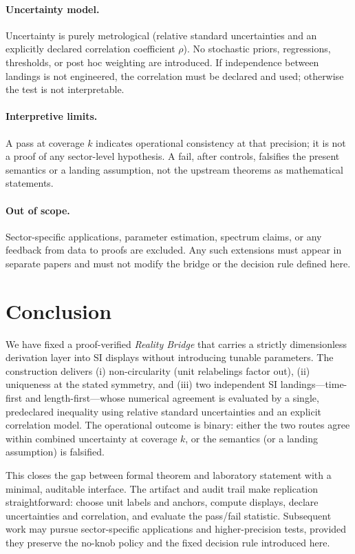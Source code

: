 \documentclass[11pt]{article}
\theoremstyle{plain}
\theoremstyle{definition}
\theoremstyle{remark}
\begin{document}
\paragraph{Uncertainty model.}
Uncertainty is purely metrological (relative standard uncertainties and an explicitly declared correlation coefficient \(\rho\)). No stochastic priors, regressions, thresholds, or post hoc weighting are introduced. If independence between landings is not engineered, the correlation must be declared and used; otherwise the test is not interpretable.

\paragraph{Interpretive limits.}
A pass at coverage \(k\) indicates operational consistency at that precision; it is not a proof of any sector-level hypothesis. A fail, after controls, falsifies the present semantics or a landing assumption, not the upstream theorems as mathematical statements.

\paragraph{Out of scope.}
Sector-specific applications, parameter estimation, spectrum claims, or any feedback from data to proofs are excluded. Any such extensions must appear in separate papers and must not modify the bridge or the decision rule defined here.

\section{Conclusion}

We have fixed a proof-verified \emph{Reality Bridge} that carries a strictly dimensionless derivation layer into SI displays without introducing tunable parameters. The construction delivers (i) non-circularity (unit relabelings factor out), (ii) uniqueness at the stated symmetry, and (iii) two independent SI landings—time-first and length-first—whose numerical agreement is evaluated by a single, predeclared inequality using relative standard uncertainties and an explicit correlation model. The operational outcome is binary: either the two routes agree within combined uncertainty at coverage \(k\), or the semantics (or a landing assumption) is falsified.

This closes the gap between formal theorem and laboratory statement with a minimal, auditable interface. The artifact and audit trail make replication straightforward: choose unit labels and anchors, compute displays, declare uncertainties and correlation, and evaluate the pass/fail statistic. Subsequent work may pursue sector-specific applications and higher-precision tests, provided they preserve the no-knob policy and the fixed decision rule introduced here.
\end{document}
